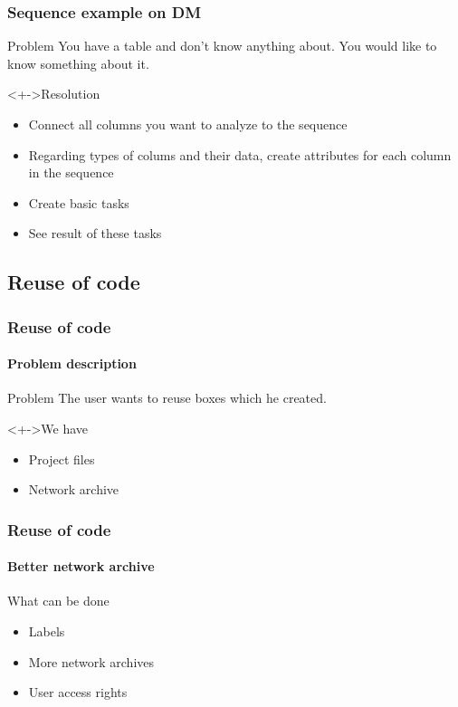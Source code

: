 \documentclass{beamer}
\begin{document}
\begin{frame}
	\frametitle{Sequence example on DM}
	\begin{block}{Problem}
		You have a table and don't know anything about.
		You would like to know something about it.
	\end{block}
	\begin{block}<+->{Resolution}
		\begin{itemize}[<+->]
			\item Connect all columns you want to analyze to the sequence
			\item Regarding types of colums and their data, create attributes for each column in the sequence
			\item Create basic tasks
			\item See result of these tasks
		\end{itemize}
	\end{block}
\end{frame}

\subsection{Reuse of code}
\begin{frame}
	\frametitle{Reuse of code}
	\framesubtitle{Problem description}
	\begin{block}{Problem}
		The user wants to reuse boxes which he created.
	\end{block}
	\begin{block}<+->{We have}
		\begin{itemize}[<+->]
			\item Project files
			\item Network archive
		\end{itemize}
	\end{block}
\end{frame}

\begin{frame}
	\frametitle{Reuse of code}
	\framesubtitle{Better network archive}
	\begin{block}{What can be done}
		\begin{itemize}[<+->]
			\item Labels
			\item More network archives
			\item User access rights
		\end{itemize}
	\end{block}
\end{frame}
\end{document}
